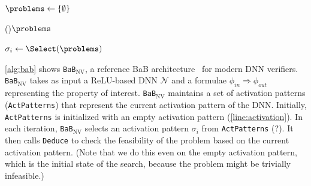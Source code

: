 \documentclass[oneside,11pt,dvipsnames]{book}
\numberwithin{equation}{section}
\theoremstyle{definition}
\theoremstyle{remark}
\newcommand{\functiontextformat}[1]{\textrm{\texttt{#1}}}
\newcommand{\tvn}[1]{\iftoggle{usecomment}{{\color{red}{[TVN]: #1}}}{}}
\newcommand{\bab}{\texttt{BaB$_{\text{NV}}$}}
\begin{document}
\begin{algorithm}
    \footnotesize
    \BlankLine

    $\problems \leftarrow \{ \emptyset \}$  
    
    \While(){$\problems$}{\label{line:dpllstart}
        $\sigma_i \gets \Select(\problems)$ 
        
    }\label{line:dpllend}
    \Return{\myunsat}
    
    \caption{The \bab{} algorithm.}\label{alg:bab}
\end{algorithm}


\autoref{alg:bab} shows \bab{}, a reference BaB architecture~\cite{nakagawa2014consolidating} for modern DNN verifiers. \bab{} takes as input a ReLU-based DNN $\mathcal{N}$ and a formulae $\phi_{in}\Rightarrow \phi_{out}$ representing the property of interest.
\bab{} maintains a set of activation patterns (\texttt{ActPatterns}) that represent the current activation pattern of the DNN. Initially, \texttt{ActPatterns} is initialized with an empty activation pattern (\autoref{line:activation}).
In each iteration, \bab{} selects an activation pattern $\sigma_i$ from \texttt{ActPatterns} (\tvn{also remove $\sigma_i$ from \texttt{ActPatterns}}?).  It then calls \functiontextformat{Deduce} to check the feasibility of the problem based on the current activation pattern. (Note that we do this even on the empty activation pattern, which is the initial state of the search, because the problem might be trivially infeasible.)
\end{document}
